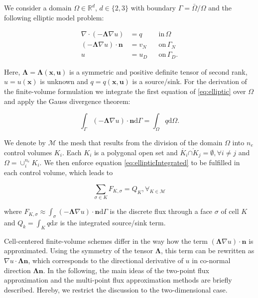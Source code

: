 We consider a domain $\Omega \in \mathbb{R}^d$, $d \in \{ 2, 3 \}$ with boundary $\Gamma = \bar{\Omega} / \Omega$ and the following elliptic model problem:

\begin{equation}
  \begin{aligned}
                   \nabla \cdot \left( - \mathbf{\Lambda} \nabla u \right) &= q   &&\mathrm{in} \, \Omega \\
               \left( - \mathbf{\Lambda} \nabla u \right) \cdot \mathbf{n} &= v_N &&\mathrm{on} \, \Gamma_N \\
                                                                   u &= u_D &&\mathrm{on} \, \Gamma_D.
    \label{eq:elliptic}
  \end{aligned}
\end{equation}

Here, $\mathbf{\Lambda} = \mathbf{\Lambda}(\mathbf{x}, \mathbf{u})$ is a symmetric and positive definite tensor of second rank, $u = u (\mathbf{x})$ is unknown and $q = q(\mathbf{x}, \mathbf{u})$ is a source/sink. For the derivation of the finite-volume formulation we integrate the first equation of \eqref{eq:elliptic} over $\Omega$ and apply the Gauss divergence theorem:

\begin{equation}
    \int_{\Gamma} \left( - \mathbf{\Lambda} \nabla u \right) \cdot \mathbf{n} \mathrm{d} \Gamma = \int_\Omega q \mathrm{d}\Omega.
    \label{eq:ellipticIntegrated}
\end{equation}

We denote by $\mathcal{M}$ the mesh that results from the division of the domain $\Omega$ into $n_e$ control volumes $K_i$. Each $K_i$ is a polygonal open set and $\mathring{K_i} \mathring{\cap K_j} = \emptyset, \forall{i \neq j}$ and $\Omega = \cup_i^{n_e} K_i$. We then enforce equation \eqref{eq:ellipticIntegrated} to be fulfilled in each control volume, which leads to

\begin{equation}
    \sum_{\sigma \in K} F_{K, \sigma} = Q_K, \forall_{K \in \mathcal{M}}
\end{equation}

where $F_{K, \sigma} \approx \int_{\sigma} \left( - \mathbf{\Lambda} \nabla u \right) \cdot \mathbf{n} \mathrm{d} \Gamma$ is the discrete flux through a face $\sigma$ of cell $K$ and $Q_k = \int_K q \mathrm{d}x$ is the integrated source/sink term. 

Cell-centered finite-volume schemes differ in the way how the term 
$(\mathbf{\Lambda} \nabla u ) \cdot \mathbf{n} $ is approximated. Using the symmetry of the tensor $\mathbf{\Lambda}$, this term can be rewritten as 
$\nabla u  \cdot \mathbf{\Lambda}\mathbf{n}$, which corresponds to the directional derivative of $u$ in co-normal direction $\mathbf{\Lambda}\mathbf{n}$. 
In the following, the main ideas of the two-point flux approximation and the multi-point flux approximation methods are briefly described. Hereby, we restrict the discussion to the two-dimensional case.

